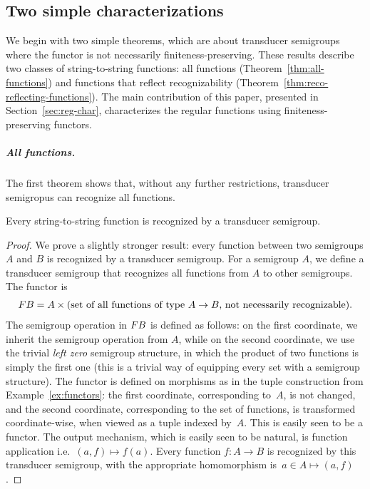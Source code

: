 \subsection{Two simple characterizations}
\label{sec:two-simple}
We begin with two simple theorems, which are about transducer semigroups where the functor is not necessarily finiteness-preserving. These results describe two classes of string-to-string functions: all functions (Theorem~\ref{thm:all-functions}) and functions that reflect recognizability (Theorem~\ref{thm:reco-reflecting-functions}).
The main contribution of this paper, presented in Section~\ref{sec:reg-char}, characterizes the regular functions using  finiteness-preserving functors.

\subparagraph{All functions.} The first theorem shows that, without any further restrictions, transducer semigropus can recognize all functions.

\begin{theorem}\label{thm:all-functions} 
 Every string-to-string function is recognized by a transducer semigroup.
\end{theorem}
\begin{proof}
 We prove a slightly stronger result: every function between two semigroups $A$ and $B$ is recognized by a transducer semigroup.
 For a semigroup $A$, we define a transducer semigroup that recognizes all functions from $A$ to other semigroups. The functor is 
 \begin{align*}
 \functor B = A \times \text{(set of all functions of type $A \to B$, not necessarily recognizable)}.
 \end{align*}
 The semigroup operation in $\functor B$ is defined as follows: on the first coordinate, we inherit the semigroup operation from $A$, while on the second coordinate, we use the trivial \emph{left zero} semigroup structure, in which  the product of two functions is simply the first one (this is a trivial way of equipping every set with a semigroup structure). The functor is defined on morphisms
as in the tuple construction from Example~\ref{ex:functors}: the first coordinate, corresponding to~$A$, is not changed, and the second coordinate, corresponding to the set of functions, is transformed coordinate-wise, when viewed as a tuple indexed by~$A$. This is easily seen to be a functor. The output mechanism, which is easily seen to be natural, is function application i.e.~$(a,f) \mapsto f(a)$.
Every function $f\colon A \to B$ is recognized by this transducer semigroup, with the appropriate homomorphism is~$a \in A \mapsto (a,f)$.
\end{proof}

